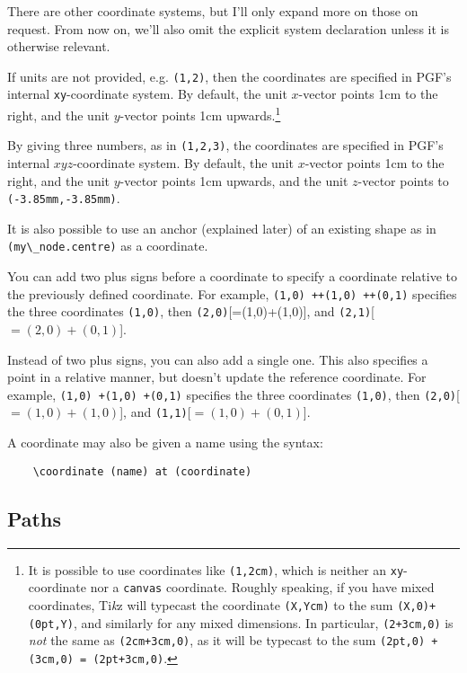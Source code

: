 \documentclass{article}
\theoremstyle{definition}
\theoremstyle{definition}
\theoremstyle{remark}
\newcommand{\Tikz}{Ti\textit{k}z{}}
\begin{document}
There are other coordinate systems, but I'll only expand more on those on request. From now on, we'll also omit the explicit system declaration unless it is otherwise relevant.

If units are not provided, e.g. \verb|(1,2)|, then the coordinates are specified in PGF's internal \verb|xy|-coordinate system. By default, the unit $x$-vector points 1cm to the right, and the unit $y$-vector points 1cm upwards.\footnote{It is possible to use coordinates like \verb|(1,2cm)|, which is neither an \verb|xy|-coordinate nor a \verb|canvas| coordinate. Roughly speaking, if you have mixed coordinates, \Tikz{} will typecast the coordinate \verb|(X,Ycm)| to the sum \verb|(X,0)+(0pt,Y)|, and similarly for any mixed dimensions. In particular, \verb|(2+3cm,0)| is \textit{not} the same as \verb|(2cm+3cm,0)|, as it will be typecast to the sum \verb|(2pt,0) + (3cm,0) = (2pt+3cm,0)|.}

By giving three numbers, as in \verb|(1,2,3)|, the coordinates are specified in PGF's internal $xyz$-coordinate system. By default, the unit $x$-vector points 1cm to the right, and the unit $y$-vector points 1cm upwards, and the unit $z$-vector points to \verb|(-3.85mm,-3.85mm)|.

It is also possible to use an anchor (explained later) of an existing shape as in \verb|(my\_node.centre)| as a coordinate.

You can add two plus signs before a coordinate to specify a coordinate relative to the previously defined coordinate. For example, \verb|(1,0) ++(1,0) ++(0,1)| specifies the three coordinates \verb|(1,0)|, then \verb|(2,0)|[=(1,0)+(1,0)], and \verb|(2,1)|[$=(2,0)+(0,1)$].

Instead of two plus signs, you can also add a single one. This also specifies a point in a relative manner, but doesn't update the reference coordinate. For example, \verb|(1,0) +(1,0) +(0,1)| specifies the three coordinates \verb|(1,0)|, then \verb|(2,0)|[$=(1,0)+(1,0)$], and \verb|(1,1)|[$=(1,0)+(0,1)$].

A coordinate may also be given a name using the syntax:
\begin{verbatim}
    \coordinate (name) at (coordinate)
\end{verbatim}




\subsection*{Paths}
\end{document}
